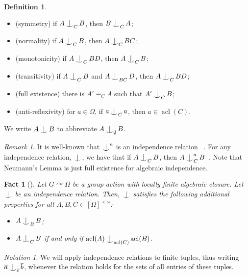 \documentclass{article}
\newtheorem{fact}[theorem]{Fact}
\theoremstyle{remark}
\newtheorem{remark}[theorem]{Remark}
\newtheorem{notation}[theorem]{Notation}
\theoremstyle{definition}
\newtheorem{definition}[theorem]{Definition}
\def\acts{\curvearrowright}
\DeclareMathOperator{\acl}{acl}
\def\Ind#1#2{#1\setbox0=\hbox{$#1x$}\kern\wd0\hbox to 0pt{\hss$#1\mid$\hss}
	\lower.9\ht0\hbox to 0pt{\hss$#1\smile$\hss}\kern\wd0}
\def\ind{\mathop{\mathpalette\Ind{}}}
\begin{document}
{{{{{\begin{definition}
        \begin{itemize}
            \item (symmetry) if $A\ind_C B$, then $B\ind_C A$;
            \item (normality)  if $A\ind_{C}B$, then $A\ind_{C}BC$;
    		\item (monotonicity) if $A\ind_{C} BD$,  then $A\ind_{C} B$;
    		\item (transitivity) if $A\ind_C B$ and $A\ind_{BC} D$, then $A\ind_{C} BD$;
    		\item (full existence) there is $A'\equiv_C A$
        such that $A'\ind_C B$;
        \item (anti-reflexivity) for $a\in\Omega$, if $a\ind_C a$, then $a\in\acl(C)$.
        \end{itemize}
        We write $A\ind B$ to abbreviate $A\ind_{\emptyset} B$.
    \end{definition}

     \begin{remark} It is well-known that $\ind^{a}$ is an independence relation%
     ~\cite[Proposition 3.16]{d2023axiomatic}.  For any independence relation, $\ind$, we have that if $A\ind_{C} B$, then $A\ind^{a}_{C} B$~\cite[Remark 1.2.11]{d2023axiomatic}. Note that Neumann's Lemma is just full existence for algebraic independence. 
    \end{remark}


    \begin{fact}[{\cite[Proposition 3.1.3]{d2023axiomatic}}] Let $G\acts\Omega$ be a group action with locally finite algebraic closure. Let $\ind$ be an independence relation. Then, $\ind$ satisfies the following additional properties for all $A,B,C\in[\Omega]^{<\omega}$:
    \begin{itemize}
          \item {}   %
           $A\ind_{B}B$;
        \item {} $A\ind_{C} B$ if and only if $\acl(A)\ind_{\acl(C)}\acl(B)$.  
    \end{itemize} 
    \end{fact}
    

 
\begin{notation}
     We will apply   independence relations to finite tuples, %
     thus writing $\overline{a}\ind_{\overline{c}}\overline{b}$,
     whenever the relation holds for the sets of all entries of these  tuples. 
\end{notation}

}}}}}
\end{document}
